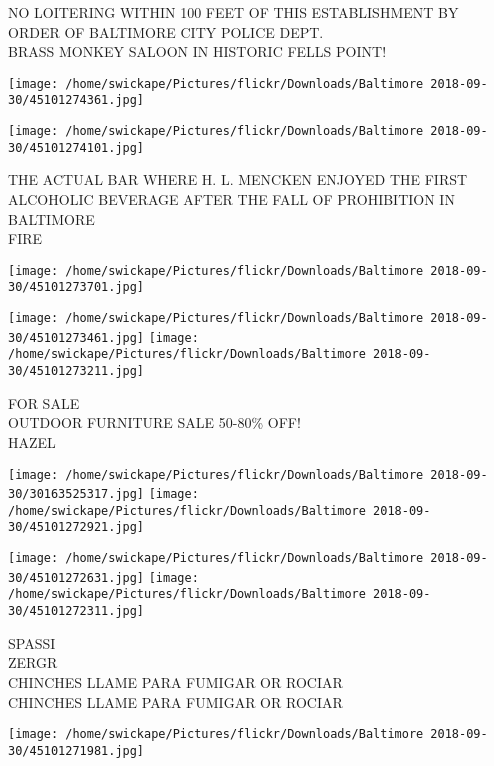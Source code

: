 \documentclass[10pt,letterpaper]{article}
\begin{document}
NO LOITERING WITHIN 100 FEET OF THIS ESTABLISHMENT BY ORDER OF BALTIMORE CITY POLICE DEPT.\\
BRASS MONKEY SALOON IN HISTORIC FELLS POINT!\\
\pagebreak

\texttt{[image: /home/swickape/Pictures/flickr/Downloads/Baltimore 2018-09-30/45101274361.jpg]}

\vspace{0.25in}
\texttt{[image: /home/swickape/Pictures/flickr/Downloads/Baltimore 2018-09-30/45101274101.jpg]}

THE ACTUAL BAR WHERE H. L. MENCKEN ENJOYED THE FIRST ALCOHOLIC BEVERAGE AFTER THE FALL OF PROHIBITION IN BALTIMORE\\
FIRE\\
\pagebreak

\texttt{[image: /home/swickape/Pictures/flickr/Downloads/Baltimore 2018-09-30/45101273701.jpg]}

\vspace{0.25in}
\texttt{[image: /home/swickape/Pictures/flickr/Downloads/Baltimore 2018-09-30/45101273461.jpg]}
\texttt{[image: /home/swickape/Pictures/flickr/Downloads/Baltimore 2018-09-30/45101273211.jpg]}

FOR SALE\\
OUTDOOR FURNITURE SALE 50{-}80\% OFF!\\
HAZEL\\
\pagebreak

\texttt{[image: /home/swickape/Pictures/flickr/Downloads/Baltimore 2018-09-30/30163525317.jpg]}
\texttt{[image: /home/swickape/Pictures/flickr/Downloads/Baltimore 2018-09-30/45101272921.jpg]}

\texttt{[image: /home/swickape/Pictures/flickr/Downloads/Baltimore 2018-09-30/45101272631.jpg]}
\texttt{[image: /home/swickape/Pictures/flickr/Downloads/Baltimore 2018-09-30/45101272311.jpg]}

SPASSI\\
ZERGR\\
CHINCHES LLAME PARA FUMIGAR OR ROCIAR\\
CHINCHES LLAME PARA FUMIGAR OR ROCIAR\\
\pagebreak

\texttt{[image: /home/swickape/Pictures/flickr/Downloads/Baltimore 2018-09-30/45101271981.jpg]}
\end{document}
